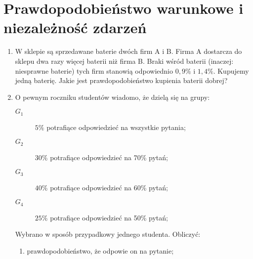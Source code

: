 \documentclass[twoside]{mwart}
\newcommand{\ans}[1]{}
\newenvironment{ansenv}{\comment}{\endcomment}
\newenvironment{ansenv}{\paragraph{Odpowiedź:}}{}
\newcommand{\ans}[1]{\begin{ansenv}#1\end{ansenv}}
\begin{document}
\section{Prawdopodobieństwo warunkowe i niezależność zdarzeń}
\begin{enumerate}
\item W sklepie są sprzedawane baterie dwóch firm A i B. Firma A dostarcza do sklepu dwa razy więcej baterii niż firma B. Braki wśród baterii (inaczej: niesprawne baterie) tych firm stanowią odpowiednio $0{,}9\%$ i $1{,}4\%$. Kupujemy jedną baterię. Jakie jest prawdopodobieństwo kupienia baterii dobrej?
\ans{
	Definiujemy zdarzenia:
	\begin{itemize}
		\item $A$ bateria pochodzi z firmy A
		\item $B$ bateria pochodzi z firmy B
		\item $D$ bateria jest dobra
		\item $Z$ bateria jest niesprawna
	\end{itemize}
	Z treści zadania budujemy układ równań:
	\[\begin{cases}
	P(A)=2P(B) \\
	P(A)+P(B)=1
	\end{cases} \]
	I obliczamy prawdopodobieństwa: \[P(A)=\frac{2}{3}\qquad P(B)=\frac{1}{3}\]
	Odczytujemy prawdopodobieństwa warunkowe:
	\[ P(Z|A)=0{,}9\% \qquad P(Z|B)=1{,}4\% \]
	Zauważamy, że $A$ i $B$ stanowią podział przestrzeni: oba są możliwe, sumują się do całej przestrzeni i są rozłączne. Zatem możemy zastosować twierdzenie o prawdopodobieństwie całkowitym:
	\[ P(Z)=P(Z|A)P(A)+P(Z|B)P(B)=0{,}9\%\cdot\frac{2}{3}+1{,}4\%\cdot\frac{1}{3}=\frac{3,2}{3}\%=\frac{32}{3000} \]
	Zauważamy, że $D=Z'$, a zatem:
	\[P(D)=1-P(Z)=\frac{2968}{3000}\approx 98,93\% \]
}
\item O pewnym roczniku studentów wiadomo, że dzielą się na grupy:
\begin{description}
\item[$G_1$] $5\%$ potrafiące odpowiedzieć na wszystkie pytania;
\item[$G_2$] $30\%$ potrafiące odpowiedzieć na 70\% pytań;
\item[$G_3$] $40\%$ potrafiące odpowiedzieć na 60\% pytań;
\item[$G_4$] $25\%$ potrafiące odpowiedzieć na 50\% pytań;
\end{description}
Wybrano w sposób przypadkowy jednego studenta. Obliczyć:
\begin{enumerate}
\item prawdopodobieństwo, że odpowie on na pytanie;

\end{enumerate}
\end{enumerate}
\end{document}
